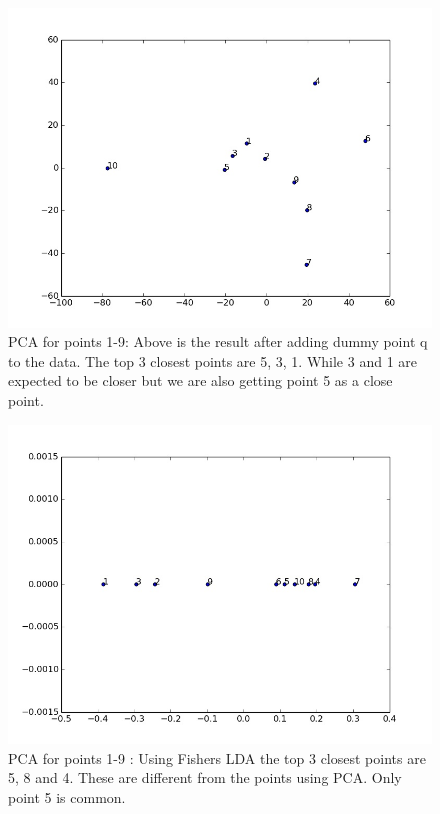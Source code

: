 \documentclass[10pt,onecolumn,letterpaper]{article}
\begin{document}
\begin{figure}[ht!]
\centering
\includegraphics[width=120mm]{figure_3.jpg}
\caption{PCA for points 1-9: Above is the result after adding dummy point q to the data. The top 3 closest points are 5, 3, 1. While 3 and 1 are expected to be closer but we are also getting point 5 as a close point. \label{overflow}}
\end{figure}

\begin{figure}[ht!]
\centering
\includegraphics[width=120mm]{figure_4.jpg}
\caption{PCA for points 1-9 : Using Fishers LDA the top 3 closest points are 5, 8 and 4. These are different from the points using PCA. Only point 5 is common.\label{overflow}}
\end{figure}
\end{document}
